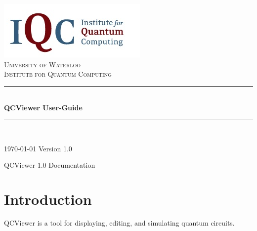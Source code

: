 \documentclass[10pt]{article}
\theoremstyle{definition}
\newcommand{\HRule}{\rule{\linewidth}{0.5mm}}
\newcommand{\qcversion}{1.0} %
\begin{document}
\begin{titlepage}

\begin{center}


\includegraphics{Figures/Logo.png}\\[1cm]    

\textsc{\LARGE University of Waterloo}\\[1.5cm]

\textsc{\Large Institute for Quantum Computing}\\[0.5cm]


\HRule \\[0.4cm]
{ \huge \bfseries QCViewer User-Guide}\\[0.4cm]

\HRule \\[1.5cm]

\vfill

{\large \today}
{\large Version \qcversion{}}

\end{center}

\end{titlepage}

\tableofcontents
\newpage

    \begin{flushright}
    QCViewer \qcversion{} Documentation
    \end{flushright}

\section{Introduction} \label{sec:Introduction}

QCViewer is a tool for displaying, editing, and simulating quantum circuits. 
\end{document}
